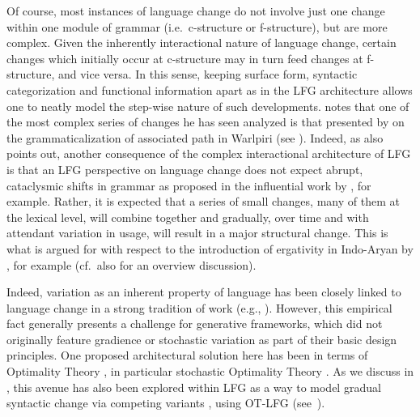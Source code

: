 \documentclass[output=paper,hidelinks]{langscibook}
\begin{document}
Of course, most instances of language change do not involve just one change within one module of grammar (i.e.~c-structure or f-structure), but are more complex. Given the inherently interactional nature of language change, certain changes which initially occur at c-structure may in turn feed changes at f-struc\-ture, and vice versa. In this sense, keeping surface form, syntactic categorization and functional information apart as in the LFG architecture allows one to neatly model the step-wise nature of such developments. \citet{vincent2001lfg} notes that one of the most complex series of changes he has seen analyzed is that presented by \citet{simpson2001} on the grammaticalization of associated path in Warlpiri (see ).  Indeed, as \citet{vincent2001lfg} also points out,  another consequence of the complex interactional architecture of LFG is that an LFG perspective on language change does not expect abrupt,  cataclysmic shifts in grammar as proposed in the influential work by \citet{lightfoot1979principles,lightfoot1991set,lightfoot1997catastrophic}, %
for example.  Rather, it is expected that a series of small changes, many of them at the lexical level, will combine together and gradually, over time and with attendant variation in usage, will result in a major structural change. This is what is argued for with respect to the introduction of ergativity in Indo-Aryan by \citet{buttahmed11}, for example (cf.~also \citet{traugott2010gradience} for an overview discussion).

Indeed, variation as an inherent property of language has been closely linked to language change in a strong tradition of work (e.g., \citealp{kroch1989reflexes,kroch2001,labov1994principles,pintzuk2003}). However, this empirical fact generally presents a challenge for generative frameworks, which did not originally feature gradience or stochastic variation as part of their basic design principles.  One proposed architectural solution here has been in terms of Optimality Theory \citep{kager99}, in particular stochastic Optimality Theory  \citep{BoersmaHayes2001}. As we discuss in , this avenue has also been explored within LFG as a way to model gradual syntactic change via competing variants \citep{clark2004stochastic}, using OT-LFG (see~).
\end{document}
